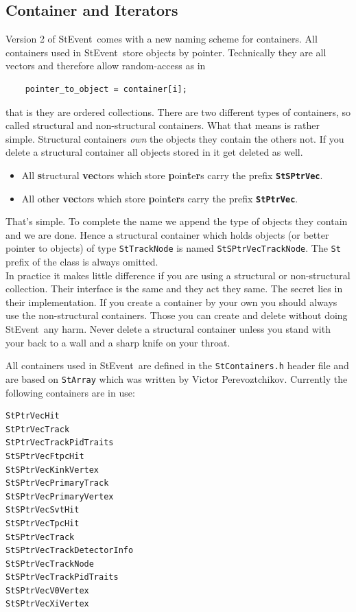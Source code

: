 \documentclass[twoside]{article}
\newcommand{\StEvent}{\textsf{StEvent}}
\begin{document}
\subsection{Container and Iterators}
\label{sec:Container}
  Version 2 of \StEvent\ comes with
a new naming scheme for containers.  All containers used in \StEvent\
store objects by pointer. Technically they are all vectors and
therefore allow random-access as in
\begin{verbatim}
    pointer_to_object = container[i];
\end{verbatim}
that is they are ordered collections. There are two different types of
containers, so called structural and non-structural containers.  What
that means is rather simple. Structural containers \emph{own} the
objects they contain the others not. If you delete a structural
container all objects stored in it get deleted as well.
\begin{itemize}
\item All \textbf{s}tructural \textbf{vec}tors which store
    \textbf{p}oin\textbf{t}e\textbf{r}s carry the prefix \textbf{\texttt{StSPtrVec}}.\\
\item All other \textbf{vec}tors which store
    \textbf{p}oin\textbf{t}e\textbf{r}s carry the prefix
    \textbf{\texttt{StPtrVec}}.
\end{itemize}
That's simple. To complete the name we append the type of objects they
contain and we are done. Hence a structural container which holds
objects (or better pointer to objects) of type \texttt{StTrackNode} is
named \texttt{StSPtrVecTrackNode}. The \texttt{St} prefix of the class
is always omitted.\\
In practice it makes little difference if you are using a structural
or non-structural collection. Their interface is the same and they act
they same. The secret lies in their implementation. If you create a
container by your own you should always use the non-structural
containers. Those you can create and delete without doing \StEvent\
any harm. Never delete a structural container unless you stand with
your back to a wall and a sharp knife on your throat.

All containers used in \StEvent\ are defined in the
\texttt{StContainers.h} header file and are based on \texttt{StArray}
which was written by Victor Perevoztchikov.  
Currently the following containers are in use:
\begin{verbatim}
StPtrVecHit
StPtrVecTrack
StPtrVecTrackPidTraits
StSPtrVecFtpcHit
StSPtrVecKinkVertex
StSPtrVecPrimaryTrack
StSPtrVecPrimaryVertex
StSPtrVecSvtHit
StSPtrVecTpcHit
StSPtrVecTrack
StSPtrVecTrackDetectorInfo
StSPtrVecTrackNode
StSPtrVecTrackPidTraits
StSPtrVecV0Vertex
StSPtrVecXiVertex
\end{verbatim}
\end{document}
